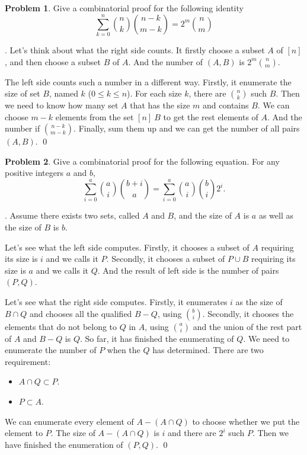 \documentclass[12pt]{article}
\theoremstyle{definition}
\newtheorem{hw}{Problem}
\newenvironment{sol}
  {\par\vspace{3mm}\noindent{\it Solution}.}
  {\qed}
\begin{document}
\begin{hw}
Give a combinatorial proof for the following identity
\[ \sum_{k=0}^{n} \binom{n}{k} \binom{n-k}{m-k} = 2^m \binom{n}{m} \]
\end{hw}

\begin{sol}
	Let's think about what the right side counts. It firstly choose a subset $A$ of $[n]$, and then choose a subset $B$ of $A$. And the number of $(A,B)$ is $2^m\binom{n}{m}$. 
	
	The left side counts such a number in a different way. Firstly, it enumerate the size of set $B$, named $k$ ($0 \leq k \leq n$). For each size $k$, there are $\binom{n}{k}$ such $B$. Then we need to know how many set $A$ that has the size $m$ and contains $B$. We can choose $m - k$ elements from the set $[n] \ B$ to get the rest elements of $A$. And the number if $\binom{n-k}{m-k}$. Finally, sum them up and we can get the number of all pairs $(A,B)$. 
\end{sol}

\begin{hw}
Give a combinatorial proof for the following equation. For any positive integers
$a$ and $b$,
\[ \sum_{i=0}^a \binom{a}{i} \binom{b+i}{a} = \sum_{i=0}^a \binom{a}{i}\binom{b}{i} 2^i .\]
\end{hw}

\begin{sol}
	Assume there exists two sets, called $A$ and $B$, and the size of $A$ is $a$ as well as the size of $B$ is $b$. 
	
	Let's see what the left side computes. Firstly, it chooses a subset of $A$ requiring its size is $i$ and we calls it $P$. Secondly, it chooses a subset of $P\cup B$ requiring its size is $a$ and we calls it $Q$. And the result of left side is the number of pairs $(P,Q)$.
	
	Let's see what the right side computes. Firstly, it enumerates $i$ as the size of $B\cap Q$ and chooses all the qualified $B-Q$, using $\binom{b}{i}$. Secondly, it chooses the elements that do not belong to $Q$ in $A$, using $\binom{a}{i}$ and the union of the rest part of $A$ and $B - Q$ is $Q$. So far, it has finished the enumerating of $Q$. We need to enumerate the number of $P$ when the $Q$ has determined. There are two requirement:
	\begin{itemize}
		\item $A \cap Q \subset P$.
		\item $P \subset A$.
	\end{itemize}
	We can enumerate every element of $A-(A\cap Q)$ to choose whether we put the element to $P$. The size of $A-(A\cap Q)$ is $i$ and there are $2^i$ such $P$. Then we have finished the enumeration of $(P,Q)$.
\end{sol}
\end{document}
